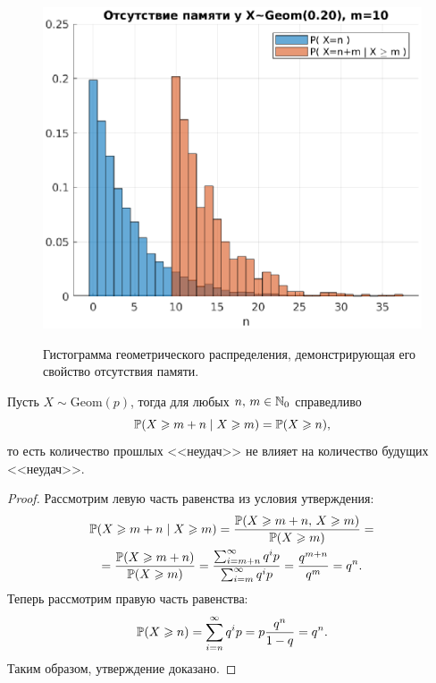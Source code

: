 \begin{figure}[h]
        \noindent
        \centering
        {
                \includegraphics[width=120mm]{task_01/memory.eps}
        }
        \caption{Гистограмма геометрического распределения, демонстрирующая его свойство отсутствия памяти.}
\end{figure}

\begin{assertion}
        Пусть $X\sim\mbox{Geom}(p)$, тогда для любых $n,\,m\in\mathbb{N}_0$ справедливо
        $$
                \mathbb{P}(X \geqslant m + n\;|\;X\geqslant m) = \mathbb{P}(X\geqslant n),
        $$
        то есть количество прошлых <<неудач>> не влияет на количество будущих <<неудач>>.
\end{assertion}
\begin{proof}
        Рассмотрим левую часть равенства из условия утверждения:
        \begin{multline*}
                \mathbb{P}(X \geqslant m+n\;|\;X\geqslant m)=
                \frac{\mathbb{P}(X\geqslant m + n,\,X\geqslant m)}{\mathbb{P}(X\geqslant m)}=\\
                =\frac{\mathbb{P}(X\geqslant m+ n)}{\mathbb{P}(X\geqslant m)}=
                \frac{\sum_{i=m+n}^{\infty}q^ip}{\sum_{i=m}^{\infty}q^ip}=
                \frac{q^{m+n}}{q^m}=
                q^n.
        \end{multline*}
        Теперь рассмотрим правую часть равенства:
        $$
                \mathbb{P}(X\geqslant n) = \sum_{i=n}^{\infty}q^ip =
                p\frac{q^n}{1 - q} = q^n.
        $$
        Таким образом, утверждение доказано.
\end{proof}

